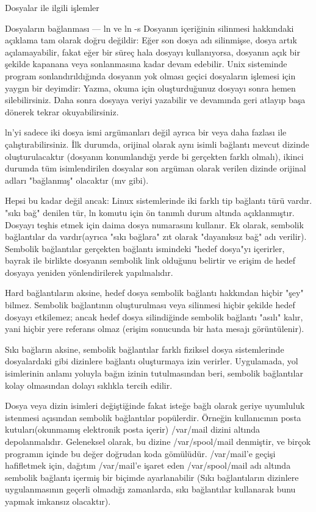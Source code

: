 \begin{section}{Dosyalar ile ilgili işlemler}
\begin{subsection}{Dosyaların bağlanması — ln ve ln -s}
Dosyanın içeriğinin silinmesi hakkındaki açıklama tam olarak doğru değildir: Eğer son dosya adı silinmişse, dosya artık açılamayabilir, fakat eğer bir süreç hala dosyayı kullanıyorsa, dosyanın açık bir şekilde kapanana veya sonlanmasına kadar devam edebilir. Unix sisteminde program sonlandırıldığında dosyanın yok olması geçici dosyaların işlemesi için yaygın bir deyimdir: Yazma, okuma için oluşturduğunuz dosyayı sonra hemen silebilirsiniz. Daha sonra dosyaya veriyi yazabilir ve devamında geri atlayıp başa dönerek tekrar okuyabilirsiniz.

ln'yi sadece iki dosya ismi argümanları değil ayrıca bir veya daha fazlası ile çalıştırabilirsiniz. İlk durumda, orijinal olarak aynı isimli bağlantı mevcut dizinde oluşturulacaktır (dosyanın konumlandığı yerde bi gerçekten farklı olmalı), ikinci durumda tüm isimlendirilen dosyalar son argüman olarak verilen dizinde orijinal adları "bağlanmış" olacaktır (mv gibi).

Hepsi bu kadar değil ancak: Linux sistemlerinde iki farklı tip bağlantı türü vardır. "sıkı bağ" denilen tür, ln komutu için ön tanımlı durum altında açıklanmıştır. Dosyayı teşhis etmek için daima dosya numarasını kullanır. Ek olarak, sembolik bağlantılar da vardır(ayrıca "sıkı bağlara" zıt olarak "dayanıksız bağ" adı verilir). Sembolik bağlantılar gerçekten  bağlantı ismindeki "hedef dosya"yı içerirler, bayrak ile birlikte dosyanın sembolik link olduğunu belirtir ve erişim de hedef dosyaya yeniden yönlendirilerek yapılmalıdır.

Hard bağlantıların aksine, hedef dosya sembolik bağlantı hakkından hiçbir "şey" bilmez. Sembolik bağlantının oluşturulması veya silinmesi hiçbir şekilde hedef dosyayı etkilemez; ancak hedef dosya silindiğinde sembolik bağlantı "asılı" kalır, yani hiçbir yere referans olmaz (erişim sonucunda bir hata mesajı görüntülenir).

Sıkı bağların aksine, sembolik bağlantılar farklı fiziksel dosya sistemlerinde dosyalardaki gibi dizinlere bağlantı oluşturmaya izin verirler. Uygulamada, yol isimlerinin anlamı yoluyla bağın izinin tutulmasından beri, sembolik bağlantılar kolay olmasından dolayı sıklıkla tercih edilir.

Dosya veya dizin isimleri değiştiğinde fakat isteğe bağlı olarak geriye uyumluluk istenmesi açısından sembolik bağlantılar popülerdir. Örneğin kullanıcının posta kutuları(okunmamış elektronik posta içerir) /var/mail dizini altında depolanmalıdır. Geleneksel olarak, bu dizine /var/spool/mail denmiştir, ve birçok programın içinde bu değer doğrudan koda gömülüdür. /var/mail'e geçişi hafifletmek için, dağıtım /var/mail'e işaret eden /var/spool/mail adı altında sembolik bağlantı içermiş bir biçimde ayarlanabilir (Sıkı bağlantıların dizinlere uygulanmasının geçerli olmadığı zamanlarda, sıkı bağlantılar kullanarak bunu yapmak imkansız olacaktır).


\end{subsection}
\end{section}
